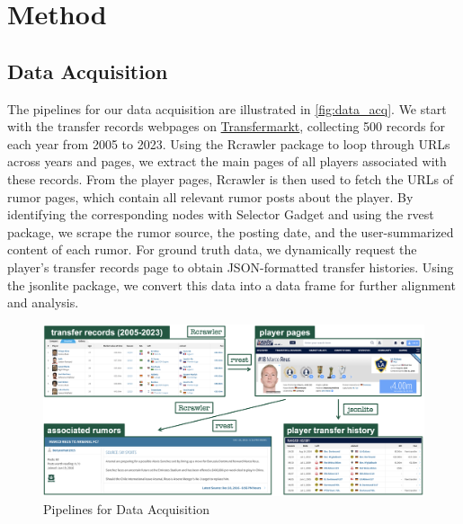 \section{Method}
\label{sec:3_method}
\subsection{Data Acquisition}
The pipelines for our data acquisition are illustrated in \autoref{fig:data_acq}. We start with the transfer records webpages on \href{www.transfermarkt.co.uk}{Transfermarkt}, collecting 500 records for each year from 2005 to 2023. Using the Rcrawler package to loop through URLs across years and pages, we extract the main pages of all players associated with these records. From the player pages, Rcrawler is then used to fetch the URLs of rumor pages, which contain all relevant rumor posts about the player. By identifying the corresponding nodes with Selector Gadget and using the rvest package, we scrape the rumor source, the posting date, and the user-summarized content of each rumor. For ground truth data, we dynamically request the player's transfer records page to obtain JSON-formatted transfer histories. Using the jsonlite package, we convert this data into a data frame for further alignment and analysis.
\begin{figure}[ht]
    \centering
    \includegraphics[width=.8\textwidth]{figs/data_acq.png}
    \caption{
        Pipelines for Data Acquisition
    }\label{fig:data_acq}
\end{figure}

